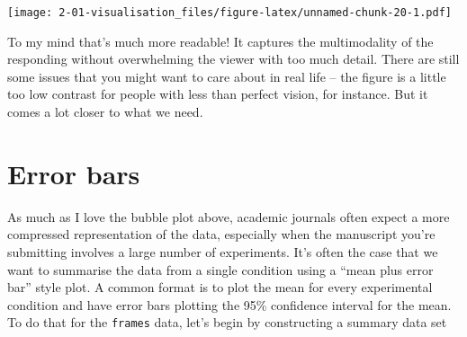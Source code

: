 \documentclass[]{book}
\newenvironment{Shaded}{\begin{snugshade}}{\end{snugshade}}
\newcommand{\DataTypeTok}[1]{\textcolor[rgb]{0.13,0.29,0.53}{#1}}
\newcommand{\DecValTok}[1]{\textcolor[rgb]{0.00,0.00,0.81}{#1}}
\newcommand{\KeywordTok}[1]{\textcolor[rgb]{0.13,0.29,0.53}{\textbf{#1}}}
\newcommand{\NormalTok}[1]{#1}
\newcommand{\OperatorTok}[1]{\textcolor[rgb]{0.81,0.36,0.00}{\textbf{#1}}}
\newcommand{\StringTok}[1]{\textcolor[rgb]{0.31,0.60,0.02}{#1}}
\begin{document}
\begin{Shaded}
\end{Shaded}

\texttt{[image: 2-01-visualisation\_files/figure-latex/unnamed-chunk-20-1.pdf]}

To my mind that's much more readable! It captures the multimodality of the responding without overwhelming the viewer with too much detail. There are still some issues that you might want to care about in real life -- the figure is a little too low contrast for people with less than perfect vision, for instance. But it comes a lot closer to what we need.

\hypertarget{error-bars}{%
\section{Error bars}\label{error-bars}}

As much as I love the bubble plot above, academic journals often expect a more compressed representation of the data, especially when the manuscript you're submitting involves a large number of experiments. It's often the case that we want to summarise the data from a single condition using a ``mean plus error bar'' style plot. A common format is to plot the mean for every experimental condition and have error bars plotting the 95\% confidence interval for the mean. To do that for the \texttt{frames} data, let's begin by constructing a summary data set

\begin{Shaded}
\end{Shaded}
\end{document}
